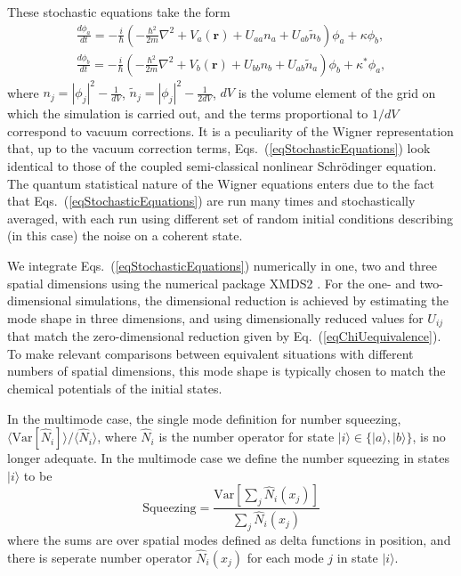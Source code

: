 \documentclass{iopart}
\begin{document}
These stochastic equations take the form
\begin{eqnarray}
\frac{d \phi_a}{dt} = -\frac{i}{\hbar}\left(-\frac{\hbar^2}{2 m}\nabla^2+V_a(\mathbf{r}) + U_{a a} n_a + U_{a b} \tilde{n}_b  \right)\phi_a   + \kappa \phi_b , \nonumber \\
\frac{d \phi_b}{dt} = -\frac{i}{\hbar}\left(-\frac{\hbar^2}{2 m}\nabla^2+V_b(\mathbf{r}) + U_{b b} n_b + U_{a b} \tilde{n}_a   \right)\phi_b   + \kappa^* \phi_a,
  \label{eqStochasticEquations}
\end{eqnarray}
where $n_j=\left|\phi_{j}\right|^2 -\frac{1}{dV}$, $\tilde{n}_j=\left|\phi_{j}\right|^2 -\frac{1}{2 dV}$, $dV$ is the volume element of the grid on which the simulation is carried out, and the terms proportional to $1/dV$ correspond to vacuum corrections. It is a peculiarity of the Wigner representation that, up to the vacuum correction terms, Eqs.~(\ref{eqStochasticEquations}) look identical to those of the coupled semi-classical nonlinear Schr{\"{o}}dinger equation. The quantum statistical nature of the Wigner equations enters due to the fact that Eqs.~(\ref{eqStochasticEquations}) are run many times and stochastically averaged, with each run using different set of random initial conditions describing (in this case) the noise on a coherent state.

We integrate Eqs.~(\ref{eqStochasticEquations}) numerically in one, two and three spatial dimensions using the numerical package XMDS2 \cite{dennis2013}.  For the one- and two-dimensional simulations, the dimensional reduction is achieved by estimating the mode shape in three dimensions, and using dimensionally reduced values for $U_{ij}$ that match the zero-dimensional reduction given by Eq.~(\ref{eqChiUequivalence}).  To make relevant comparisons between equivalent situations with different numbers of spatial dimensions, this mode shape is typically chosen to match the chemical potentials of the initial states.

In the multimode case, the single mode definition for number squeezing, $\langle\mathrm{Var}[\hat{N}_i] \rangle / \langle \hat{N}_i \rangle$, where $\hat{N}_i$ is the number operator for state $|i\rangle \in \{|a\rangle, |b\rangle \}$, is no longer adequate. In the multimode case we define the number squeezing in states $|i\rangle$ to be
\begin{equation}
\mathrm{Squeezing} = \frac{\mathrm{Var} \left[ \sum_j \hat{N}_i(x_j) \right]} { \sum_j \hat{N}_i(x_j) }
\label{eqMultimodeSqueezingDefinition}
\end{equation}
where the sums are over spatial modes defined as delta functions in position, and there is seperate number operator $\hat{N}_i(x_j)$ for each mode $j$ in state $|i\rangle$.
\end{document}
